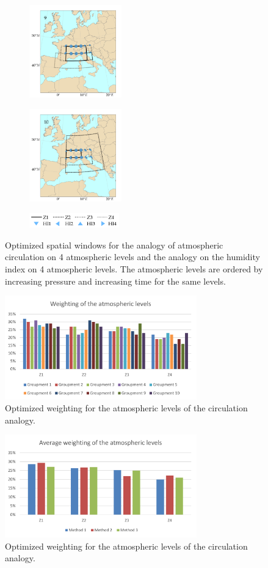 \documentclass[twocol]{ametsoc}
\begin{document}
\begin{figure}[htb]
	\begin{subfigure}{.5\columnwidth}
		\centering
		\includegraphics[width=4cm]{figures/spatial_win_z4-hi4/Spatial_windows_9.png}
	\end{subfigure}%
	\begin{subfigure}{.5\columnwidth}
		\centering
		\includegraphics[width=4cm]{figures/spatial_win_z4-hi4/Spatial_windows_10.png}
	\end{subfigure}
	\begin{subfigure}{.5\columnwidth}
		\centering
		\includegraphics[width=3.9cm]{figures/spatial_win_z4-hi4/legend.png}
	\end{subfigure}
	\caption{Optimized spatial windows for the analogy of atmospheric circulation on 4 atmospheric levels and the analogy on the humidity index on 4 atmospheric levels. The atmospheric levels are ordered by increasing pressure and increasing time for the same levels.}
	\label{fig:spatial_windows_z4-hi4}
\end{figure}


\begin{figure}[htb]
	\centerline{\includegraphics[width=8.3cm]{figures/figure_levels_weights.pdf}}
	\caption{Optimized weighting for the atmospheric levels of the circulation analogy.}
	\label{fig:levels_weights}
\end{figure}

\begin{figure}[htb]
	\centerline{\includegraphics[width=8.3cm]{figures/figure_levels_weights_average.pdf}}
	\caption{Optimized weighting for the atmospheric levels of the circulation analogy.}
	\label{fig:levels_weights_average}
\end{figure}
\end{document}
